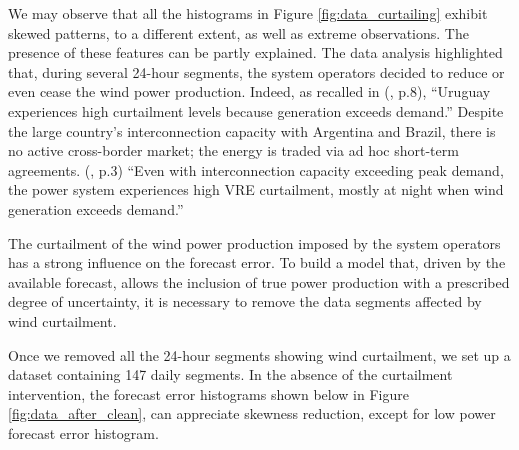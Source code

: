 \documentclass[11pt]{article}
\theoremstyle{definition}
\begin{document}
We may observe that all the histograms in Figure \ref{fig:data_curtailing} exhibit skewed patterns, to a different extent, as well as extreme observations. The presence of these features can be partly explained. The data analysis highlighted that, during several 24-hour segments, the system operators decided to reduce or even cease the wind power production. Indeed, as recalled in (\cite{irena2}, p.8), ``Uruguay experiences high curtailment levels because generation exceeds demand.'' Despite the large country's interconnection capacity with Argentina and Brazil, there is no active cross-border market; the energy is traded via ad hoc short-term agreements. (\cite{irena2}, p.3) ``Even with interconnection capacity exceeding peak demand, the power system experiences high VRE curtailment, mostly at night when wind generation exceeds demand.''
  
The curtailment of the wind power production imposed by the system operators has a strong influence on the forecast error. To build a model that, driven by the available forecast, allows the inclusion of true power production with a prescribed degree of uncertainty, it is necessary to remove the data segments affected by wind curtailment.

Once we removed all the 24-hour segments showing wind curtailment, we set up a dataset containing 147 daily segments. 
In the absence of the curtailment intervention, the forecast error histograms shown below in Figure \ref{fig:data_after_clean}, can appreciate skewness reduction, except for low power forecast error histogram.
\end{document}
